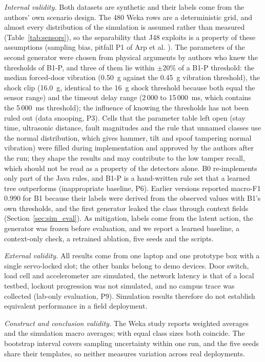 \documentclass[journal,onecolumn]{IEEEtran}
\begin{document}
\textit{Internal validity.} Both datasets are synthetic and their labels come from the authors' own scenario design.
The 480 Weka rows are a deterministic grid, and almost every distribution of the simulation is assumed rather than
measured (Table~\ref{tab:sensors}), so the separability that J48 exploits is a property of these assumptions (sampling
bias, pitfall P1 of Arp et al. \cite{arp2022dos}). The parameters of the second generator were chosen from physical
arguments by authors who knew the thresholds of B1-P, and three of them lie within $\pm$20\% of a B1-P threshold: the
median forced-door vibration (0.50~g against the 0.45~g vibration threshold), the shock clip (16.0~g, identical to the
16~g shock threshold because both equal the sensor range) and the timeout delay range (2\,000 to 15\,000~ms, which
contains the 5\,000~ms threshold); the influence of knowing the thresholds has not been ruled out (data snooping, P3).
Cells that the parameter table left open (stay time, ultrasonic distance, fault magnitudes and the rule that unnamed
classes use the normal distribution, which gives hammer, tilt and spoof tampering normal vibration) were filled during
implementation and approved by the authors after the run; they shape the results and may contribute to the low tamper
recall, which should not be read as a property of the detectors alone. B0 re-implements only part of the Java rules,
and B1-P is a hand-written rule set that a learned tree outperforms (inappropriate baseline, P6). Earlier versions
reported macro-F1 0.990 for B1 because their labels were derived from the observed values with B1's own thresholds,
and the first generator leaked the class through context fields (Section~\ref{sec:sim_eval}). As mitigation, labels
come from the latent action, the generator was frozen before evaluation, and we report a learned baseline, a
context-only check, a retrained ablation, five seeds and the scripts.

\textit{External validity.} All results come from one laptop and one prototype box with a single servo-locked slot;
the other banks belong to demo devices. Door switch, load cell and accelerometer are simulated, the network latency is
that of a local testbed, lockout progression was not simulated, and no campus trace was collected (lab-only
evaluation, P9). Simulation results therefore do not establish equivalent performance in a field deployment.

\textit{Construct and conclusion validity.} The Weka study reports weighted averages and the simulation macro
averages; with equal class sizes both coincide. The bootstrap interval covers sampling uncertainty within one run, and
the five seeds share their templates, so neither measures variation across real deployments.
\end{document}
